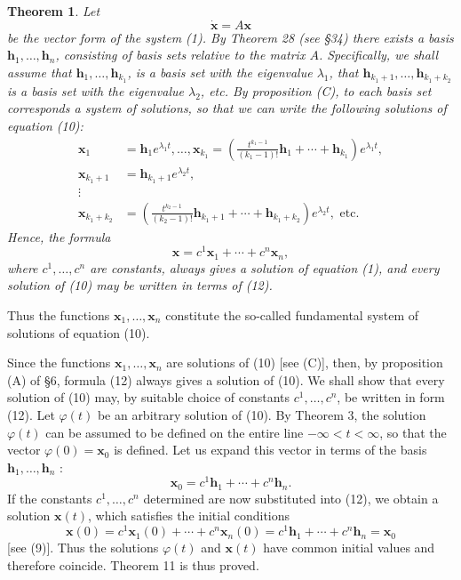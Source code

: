 \documentclass[10pt,a5paper]{book}
\makeatletter
\theoremstyle{plain}
\newtheorem{theorem}{Theorem}
\theoremstyle{definition}
\theoremstyle{remark}
\renewenvironment{proof}[1][\proofname]{\par
  \pushQED{\qed}%
  \normalfont\topsep6\p@\@plus6\p@\relax
  \trivlist
  \item\relax{\itshape #1\@addpunct{.}}\hspace\labelsep\ignorespaces
}{\popQED\endtrivlist\@endpefalse}
\makeatother
\begin{document}
\begin{theorem}
Let
\begin{equation*}
\dot{\mathbf{x}}=A \mathbf{x} \tag{10}
\end{equation*}
be the vector form of the system (1). By Theorem 28 (see §34) there exists a basis $\mathbf{h}_{1}, \ldots, \mathbf{h}_{n}$, consisting of basis sets relative to the matrix $A$. Specifically, we shall assume that $\mathbf{h}_{1}, \ldots, \mathbf{h}_{k_{1}}$, is a basis set with the eigenvalue $\lambda_{1}$, that $\mathbf{h}_{k_{1}+1}, \ldots, \mathbf{h}_{k_{1}+k_{2}}$ is a basis set with the eigenvalue $\lambda_{2}$, etc. By proposition (C), to each basis set corresponds a system of solutions, so that we can write the following solutions of equation (10):
\begin{align*}
\mathbf{x}_{1} & =\mathbf{h}_{1} e^{\lambda_{1} t}, \ldots, \mathbf{x}_{k_{1}}=\left(\frac{t^{k_{1}-1}}{\left(k_{1}-1\right)!} \mathbf{h}_{1}+\cdots+\mathbf{h}_{k_{1}}\right) e^{\lambda_{1} t}, \\
\mathbf{x}_{k_{1}+1} & =\mathbf{h}_{k_{1}+1} e^{\lambda_{2} t},  \tag{11}\\
\vdots & \\
\mathbf{x}_{k_{1}+k_{2}} & =\left(\frac{t^{k_{2}-1}}{\left(k_{2}-1\right)!} \mathbf{h}_{k_{1}+1}+\cdots+\mathbf{h}_{k_{1}+k_{2}}\right) e^{\lambda_{2} t}, \text { etc. }
\end{align*}
Hence, the formula
\begin{equation*}
\mathbf{x}=c^{1} \mathbf{x}_{1}+\cdots+c^{n} \mathbf{x}_{n}, \tag{12}
\end{equation*}
where $c^{1}, \ldots, c^{n}$ are constants, always gives a solution of equation (1), and every solution of (10) may be written in terms of (12).
\end{theorem}

Thus the functions $\mathbf{x}_{1}, \ldots, \mathbf{x}_{n}$ constitute the so-called fundamental system of solutions of equation (10).

\begin{proof}
Since the functions $\mathbf{x}_{1}, \ldots, \mathbf{x}_{n}$ are solutions of (10) [see (C)], then, by proposition (A) of §6, formula (12) always gives a solution of (10). We shall show that every solution of (10) may, by suitable choice of constants $c^{1}, \ldots, c^{n}$, be written in form (12). Let $\varphi(t)$ be an arbitrary solution of (10). By Theorem 3, the solution $\varphi(t)$ can be assumed to be defined on the entire line $-\infty<t<\infty$, so that the vector $\varphi(0)=\mathbf{x}_{0}$ is defined. Let us expand this vector in terms of the basis $\mathbf{h}_{1}, \ldots, \mathbf{h}_{n}$ :
\[
\mathbf{x}_{0}=c^{1} \mathbf{h}_{1}+\cdots+c^{n} \mathbf{h}_{n} .
\]
If the constants $c^{1}, \ldots, c^{n}$ determined are now substituted into (12), we obtain a solution $\mathbf{x}(t)$, which satisfies the initial conditions
\[
\mathbf{x}(0)=c^{1} \mathbf{x}_{1}(0)+\cdots+c^{n} \mathbf{x}_{n}(0)=c^{1} \mathbf{h}_{1}+\cdots+c^{n} \mathbf{h}_{n}=\mathbf{x}_{0}
\]
[see (9)]. Thus the solutions $\varphi(t)$ and $\mathbf{x}(t)$ have common initial values and therefore coincide. Theorem 11 is thus proved.
\end{proof}
\end{document}

